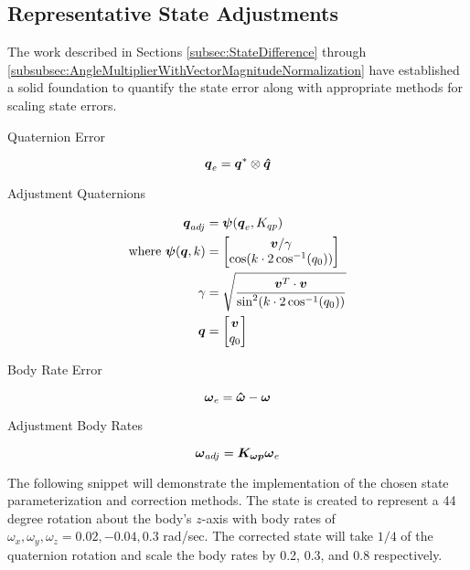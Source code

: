 \subsection{Representative State Adjustments}
\label{subsec:RepresentativeStateAdjustments}

The work described in Sections \ref{subsec:StateDifference} through \ref{subsubsec:AngleMultiplierWithVectorMagnitudeNormalization} have established a solid foundation to quantify the state error along with appropriate methods for scaling state errors.

Quaternion Error

\begin{equation}
  \boldsymbol{q}_e = \boldsymbol{q}^* \otimes \boldsymbol{\hat{q}}
\end{equation}

Adjustment Quaternions

\begin{equation}
  \begin{aligned}
    \boldsymbol{q}_{adj} &= \boldsymbol{\psi}(\boldsymbol{q}_e, K_{qp}) \\
    \text{where } \boldsymbol{\psi}(\boldsymbol{q}, k) &= \begin{bmatrix} \boldsymbol{v} / \gamma \\ \cos ( k \cdot 2\cos^{-1} (q_0))  \end{bmatrix} \\
    \gamma &= \sqrt{\frac{\boldsymbol{v}^T \cdot \boldsymbol{v}}{\sin^2 ( k \cdot 2\cos^{-1} (q_0))}} \\
    \boldsymbol{q} &= \begin{bmatrix} \boldsymbol{v} \\ q_0  \end{bmatrix}
  \end{aligned}
\end{equation}

Body Rate Error

\begin{equation}
  \boldsymbol{\omega}_e = \boldsymbol{\hat{\omega}} - \boldsymbol{\omega}
\end{equation}

Adjustment Body Rates

\begin{equation}
  \boldsymbol{\omega}_{adj} = \boldsymbol{K_{\omega p}} \boldsymbol{\omega}_e
\end{equation}

The following snippet will demonstrate the implementation of the chosen state parameterization and correction methods.  The state is created to represent a 44 degree rotation about the body's $z$-axis with body rates of $\omega_x, \omega_y, \omega_z = 0.02, -0.04, 0.3$ rad/sec.  The corrected state will take $1/4$ of the quaternion rotation and scale the body rates by 0.2, 0.3, and 0.8 respectively.

